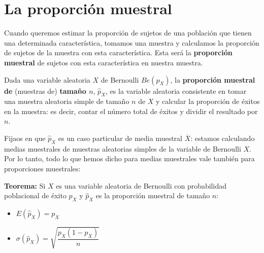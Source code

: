 \documentclass[
  spanish,
  letterpaper,
  DIV=11,
  numbers=noendperiod]{scrreprt}
\begin{document}
\section{La proporción muestral}\label{la-proporciuxf3n-muestral}

Cuando queremos estimar la proporción de sujetos de una población que
tienen una determinada característica, tomamos una muestra y calculamos
la proporción de sujetos de la muestra con esta característica. Esta
será la \textbf{proporción muestral} de sujetos con esta característica
en nuestra muestra.

Dada una variable aleatoria \(X\) de Bernoulli \(Be(p_X)\), la
\textbf{proporción muestral de} (muestras de) \textbf{tamaño \(n\)},
\(\widehat{p}_X\), es la variable aleatoria consistente en tomar una
muestra aleatoria simple de tamaño \(n\) de \(X\) y calcular la
proporción de éxitos en la muestra: es decir, contar el número total de
éxitos y dividir el resultado por \(n\).

Fijaos en que \(\widehat{p}_X\) es un caso particular de media muestral
\(\overline{X}\): estamos calculando medias muestrales de muestras
aleatorias simples de la variable de Bernoulli \(X\). Por lo tanto, todo
lo que hemos dicho para medias muestrales vale también para proporciones
muestrales:

\textbf{Teorema:} Si \(X\) es una variable aleatoria de Bernoulli con
probabilidad poblacional de éxito \(p_X\) y \(\widehat{p}_X\) es la
proporción muestral de tamaño \(n\):

\begin{itemize}
\item
  \(E(\widehat{p}_X)=p_X\)
\item
  \(\sigma({\widehat{p}_X})=\sqrt{\dfrac{p_X(1-p_X)}{n}}\)
\end{itemize}
\end{document}
